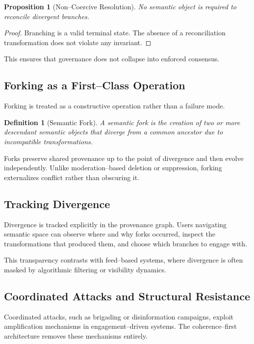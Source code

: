 \documentclass[11pt]{article}
\newtheorem{definition}{Definition}
\newtheorem{proposition}{Proposition}
\begin{document}
\begin{proposition}[Non--Coercive Resolution]
No semantic object is required to reconcile divergent branches.
\end{proposition}

\begin{proof}
Branching is a valid terminal state. The absence of a reconciliation transformation does
not violate any invariant.
\end{proof}

This ensures that governance does not collapse into enforced consensus.

\subsection{Forking as a First--Class Operation}

Forking is treated as a constructive operation rather than a failure mode.

\begin{definition}[Semantic Fork]
A semantic fork is the creation of two or more descendant semantic objects that diverge
from a common ancestor due to incompatible transformations.
\end{definition}

Forks preserve shared provenance up to the point of divergence and then evolve
independently. Unlike moderation--based deletion or suppression, forking externalizes
conflict rather than obscuring it.

\subsection{Tracking Divergence}

Divergence is tracked explicitly in the provenance graph. Users navigating semantic space
can observe where and why forks occurred, inspect the transformations that produced them,
and choose which branches to engage with.

This transparency contrasts with feed--based systems, where divergence is often masked by
algorithmic filtering or visibility dynamics.

\subsection{Coordinated Attacks and Structural Resistance}

Coordinated attacks, such as brigading or disinformation campaigns, exploit amplification
mechanisms in engagement--driven systems. The coherence--first architecture removes these
mechanisms entirely.
\end{document}
